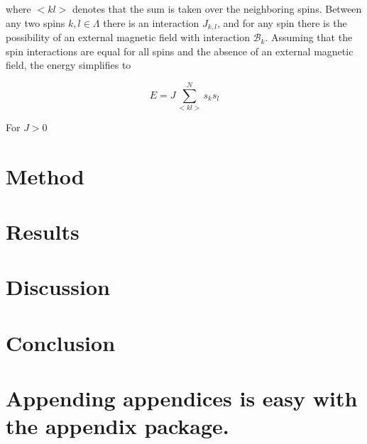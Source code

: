 \documentclass[aps,reprint]{revtex4-1}
\newcommand\blankpage{%
  \null
  \thispagestyle{empty}%
  \addtocounter{page}{-1}%
  \newpage}
\begin{document}
where \(<kl>\) denotes that the sum is taken over the neighboring spins.
Between any two spins \(k, l \in \Lambda\) there is an interaction \(J_{k,l}\),
and for any spin there is the possibility of an external magnetic field with
interaction \(\mathcal{B}_{k}\). Assuming that the spin interactions are equal
for all spins and the absence of an external magnetic field, the energy
simplifies to

\begin{equation}
  \label{eq:3}
  E = J\sum_{<kl>}^{N}s_{k}s_{l}
\end{equation}

For \(J>0\)


\section{Method}
\label{sec:method}

\section{Results}
\label{sec:results}

\section{Discussion}
\label{sec:discussion}

\section{Conclusion}
\label{sec:conclusion}


\blankpage
\appendix
\section{Appending appendices is easy with the appendix package.}
\blankpage
\end{document}
